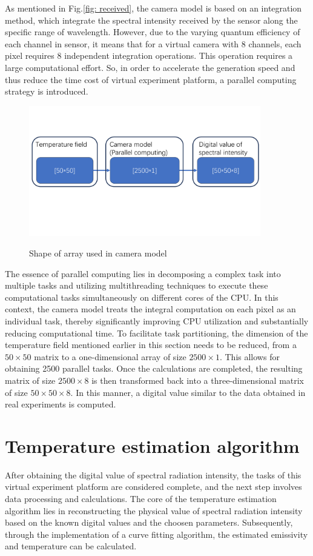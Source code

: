 As mentioned in Fig.\ref{fig: received}, the camera model is based on an integration 
method, which integrate the spectral intensity received by the sensor along the 
specific range of wavelength. However, due to the varying quantum 
efficiency of each channel in sensor, it means that for a virtual camera 
with 8 channels, each pixel requires 8 independent integration operations. 
This operation requires a large computational effort. So, in order to 
accelerate the generation speed and thus reduce the time cost of virtual 
experiment platform, a parallel computing strategy is introduced.


\begin{figure}[htbp]
  \centering
  \includegraphics[width=0.9\textwidth]{figures/reshape.pdf}
  \label{fig: reshape}
  \caption{Shape of array used in camera model}
\end{figure}


The essence of parallel computing lies in decomposing a complex task into 
multiple tasks and utilizing multithreading techniques to execute these 
computational tasks simultaneously on different cores of the CPU. In 
this context, the camera model treats the integral computation on each pixel as an 
individual task, thereby significantly improving CPU utilization and substantially 
reducing computational time\cite{Asanovic.2009}. To facilitate task partitioning, the 
dimension of the temperature field 
mentioned earlier in this section needs to be reduced, from 
a $50\times 50$ matrix to a one-dimensional array of size $2500\times1$. This allows for 
obtaining 2500 parallel tasks. Once the calculations are completed, the 
resulting matrix of size $2500\times8$ is then transformed back into a three-dimensional 
matrix of size $50\times50\times8$. In this manner, a digital value similar to the data 
obtained in real experiments is computed.


\section{Temperature estimation algorithm}
After obtaining the digital value of spectral radiation intensity, 
the tasks of this virtual experiment platform are considered complete, 
and the next step involves data processing and calculations. The core 
of the temperature estimation algorithm lies in reconstructing the physical 
value of spectral radiation intensity based on the known digital values and 
the choosen parameters. 
Subsequently, through the implementation of a curve fitting algorithm, the 
estimated emissivity and temperature can be calculated.


